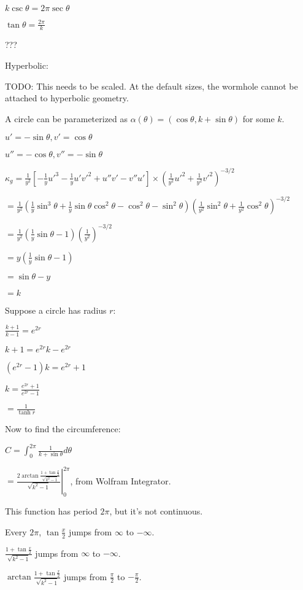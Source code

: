 \documentclass[12pt]{amsart}
\begin{document}
$k\csc\theta = 2\pi\sec\theta$

$\tan\theta = \frac{2\pi}{k}$

???

Hyperbolic:

TODO: This needs to be scaled. At the default sizes, the wormhole cannot be attached to hyperbolic geometry.

A circle can be parameterized as $\alpha(\theta) = (\cos \theta, k + \sin \theta)$ for some $k$.

$u' = -\sin\theta, v' = \cos\theta$

$u'' = -\cos\theta, v'' = -\sin\theta$

$\kappa_g = \frac{1}{y^2}[-\frac{1}{y}u'^3 - \frac{1}{y}u'v'^2 + u''v' - v''u'] \times (\frac{1}{y^2}u'^2 + \frac{1}{y^2}v'^2)^{-3/2}$

$= \frac{1}{y^2}\left(\frac{1}{y}\sin^3\theta + \frac{1}{y}\sin\theta\cos^2\theta - \cos^2\theta - \sin^2\theta\right)\left(\frac{1}{y^2}\sin^2\theta + \frac{1}{y^2}\cos^2\theta\right)^{-3/2}$

$= \frac{1}{y^2}\left(\frac{1}{y}\sin\theta - 1\right)\left(\frac{1}{y^2}\right)^{-3/2}$

$= y\left(\frac{1}{y}\sin\theta - 1\right)$

$= \sin\theta - y$

$= k$

Suppose a circle has radius $r$:

$\frac{k+1}{k-1} = e^{2r}$

$k+1 = e^{2r}k-e^{2r}$

$(e^{2r}-1)k = e^{2r}+1$

$k = \frac{e^{2r}+1}{e^{2r}-1}$

$= \frac{1}{\tanh r}$

Now to find the circumference:

$C = \int_0^{2\pi} \frac{1}{k+\sin\theta} d\theta$


$= \left.\frac{2\arctan \frac{1 + \tan\frac{x}{2}}{\sqrt{k^2-1}}}{\sqrt{k^2-1}}\right|_0^{2\pi}$, from Wolfram Integrator.

This function has period $2\pi$, but it's not continuous.

Every $2\pi$, $\tan\frac{x}{2}$ jumps from $\infty$ to $-\infty$.

$\frac{1 + \tan\frac{x}{2}}{\sqrt{k^2-1}}$ jumps from $\infty$ to $-\infty$.

$\arctan \frac{1 + \tan\frac{x}{2}}{\sqrt{k^2-1}}$ jumps from $\frac{\pi}{2}$ to $-\frac{\pi}{2}$.
\end{document}
